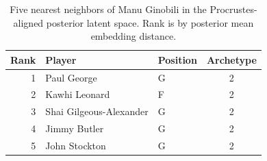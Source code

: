 \begin{table}[htbp]
  \centering\small
  \begin{tabular}{rllc}
    \toprule
    Rank & Player & Position & Archetype \\
    \midrule
    1 & Paul George & G & 2 \\
    2 & Kawhi Leonard & F & 2 \\
    3 & Shai Gilgeous-Alexander & G & 2 \\
    4 & Jimmy Butler & G & 2 \\
    5 & John Stockton & G & 2 \\
    \bottomrule
  \end{tabular}
  \caption{Five nearest neighbors of Manu Ginobili in the Procrustes-aligned posterior latent space. Rank is by posterior mean embedding distance.}
\end{table}

